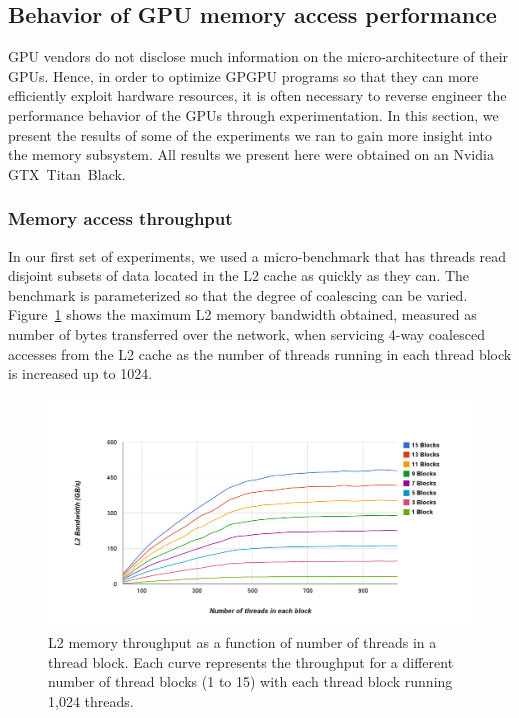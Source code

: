 \subsection{Behavior of GPU memory access performance}  \label{GPUBehavior}

GPU vendors do not disclose much information on the micro-architecture of their GPUs.
Hence, in order to optimize GPGPU programs so that they can more efficiently exploit hardware
resources, it is often necessary to reverse engineer the performance behavior of the GPUs through
experimentation.
In this section, we present the results of some of the experiments we ran to gain more insight into the memory subsystem.
All results we present here were obtained on an Nvidia GTX~Titan~Black.


\subsubsection{Memory access throughput}
In our first set of experiments, we used a micro-benchmark that has threads read disjoint subsets of data
located in the L2 cache as quickly as they can. 
The benchmark is parameterized so that the degree of coalescing can be varied.
Figure~\ref{fig:MemBandwidth} shows the maximum L2 memory bandwidth obtained, measured as
number of bytes transferred over the network, when servicing 4-way coalesced
accesses from the L2 cache as the number of threads running in each thread block is increased up to
1024.



\begin{figure}
\center
\includegraphics[scale=0.20]{AllInL2MultipleSM4WayColaesced.png}
\caption{\footnotesize\textnormal{L2 memory throughput as a function of number of threads in a thread block. Each curve represents the throughput for a different number of thread blocks (1 to 15) with each thread block running 1,024 threads.}}
\label{fig:MemBandwidth}
\end{figure}

